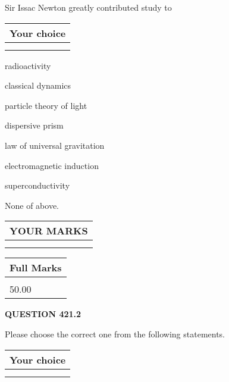 \documentclass[12pt]{article}
\begin{document}
  
Sir Issac Newton greatly contributed study to
  
  
\noindent\hspace{3.0in} \begin{tabular}{|l|}
\hline
Your choice \\
\hline
 \\ 
 \\ 
\hline
\end{tabular}
  
  
 
 
radioactivity
 
 
classical dynamics
 
 
particle theory of light
 
 
dispersive prism
 
 
law of universal gravitation
 
 
electromagnetic induction
 
 
superconductivity
 
 
 None of above.
 
 
  
\vspace{0.2in}
  
\noindent\begin{tabular}{|l|}
\hline
 YOUR MARKS  \\
\hline
 \\ 
 \\ 
\hline
\end{tabular}
\hspace{0.05in} \begin{tabular}{|l|}
\hline
 Full Marks  \\
\hline
 \\ 
50.00 \\
\hline
\end{tabular}
{\textbf{\Large{QUESTION
421.2 
}}}
  
  
Please choose the correct one from the following statements.
  
  
\noindent\hspace{3.0in} \begin{tabular}{|l|}
\hline
Your choice \\
\hline
 \\ 
 \\ 
\hline
\end{tabular}
  
\end{document}
